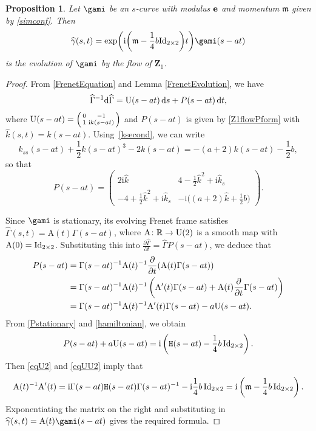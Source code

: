 \documentclass[10pt,a4paper]{amsart}
\newcommand\kk{k} %
\def\ri{\mathrm{i}}
\newcommand\VZ{\mathbf Z}
\newcommand{\ds}{\,{\rm d}s}
\def\gam{\gamma} %
\def\di{\partial}
\def\R{\mathbb R}
\newcommand\be{{\bf e}}
\newcommand\gamf{\widehat{\gam}} %
\newcommand\Gamf{\widehat{\Gamma}} %
\newcommand\kh{\widehat{\kk}} %
\newcommand\rA{\mathrm{A}}
\numberwithin{equation}{section}
\newtheorem{Proposition}[Theorem]{Proposition}
 { \theoremstyle{definition}
\newtheorem{Definition}[Theorem]{Definition}
\newtheorem{Note}[Theorem]{Note}
\newtheorem{Example}[Theorem]{Example}
\newtheorem{Remark}[Theorem]{Remark} }
\begin{document}
\begin{Proposition} \label{timeevolution}Let $\gami$ be an $s$-curve with modulus $\be$ and momentum ${\mathfrak m}$ given by \eqref{simconf}.
Then
\begin{equation*}%
\gamf(s,t)= \exp \biggl(\ri \biggl({\mathfrak m}-\frac14 b{\rm Id}_{2\times 2}\biggr)t\biggr) \gami(s-at)
\end{equation*}
is the evolution of $\gami$ by the flow of $\VZ_1$. \end{Proposition}

\begin{proof} From \eqref{FrenetEquation} and Lemma \ref{FrenetEvolution}, we have
\[\Gamf^{-1}  {\rm d}\Gamf = {\rm U}(s-at)\ds + P(s-at)\, {\rm d}t,\]
where ${\rm U}(s-at) = \left( \begin{smallmatrix} 0 & -1 \\ 1 & \ri k(s-at) \end{smallmatrix} \right)$ and $
P(s-at)$ is given by \eqref{Z1flowPform} with $\kh(s,t) = k(s-at)$.
Using~\eqref{ksecond}, we can write
\[\kk_{ss}(s-at)+\frac12 \kk(s-at)^3-2\kk(s-at)=-(a+2)\kk(s-at)-\frac12 b,\]
so that
\begin{equation}\label{Pstationary}
P(s-a t) =
\begin{pmatrix} 2\ri \kh & 4-\tfrac12 \kh^2 +\ri \kh_s \\
-4+\tfrac12 \kh^2 + \ri \kh_s & -\ri\bigl((a+2)\kh+\tfrac12{b}\bigr) \end{pmatrix}.
\end{equation}

Since $\gami$ is stationary, its evolving Frenet frame satisfies $\Gamf(s,t)=\rA(t) \Gamma(s-at)$, where
${\rA\colon\R\to {\rm U}(2)}$ is a smooth map with $\rA(0)={\rm Id}_{2\times 2}$.
Substituting this into $\frac{\partial \Gamf}{\partial t} = \Gamf P(s-at)$, we deduce that
\begin{align}
P(s-at)={}& \Gamma(s-at)^{-1} \rA(t)^{-1}\frac{\di}{\di t} (\rA(t) \Gamma(s-at))\nonumber\\
={}&\Gamma(s-at)^{-1} \rA(t)^{-1}\left(\rA'(t)  \Gamma(s-at)+\rA(t) \frac{\di}{\di t} \Gamma(s-at)\right)\nonumber\\
={}&\Gamma(s-at)^{-1} \rA(t)^{-1} \rA'(t) \Gamma(s-at) -a {\rm U}(s-at).\label{eqU2}
\end{align}
From \eqref{Pstationary} and \eqref{hamiltonian}, we obtain
\begin{equation}\label{eqUU2} P(s-at)+a {\rm U}(s-at)=\ri \left({\mathtt H}(s-at)-\frac14 b\,{\rm Id}_{2\times 2}\right).\end{equation}
Then \eqref{eqU2} and \eqref{eqUU2} imply that
\[ \rA(t)^{-1} \rA'(t) =\ri \Gamma(s-at) {\mathtt H}(s-at) \Gamma(s-a t)^{-1}
-\ri \frac14 b\,{\rm Id}_{2\times 2}= \ri \left({\mathfrak m}-\frac14{b}\,{\rm Id}_{2\times 2}\right).\]
Exponentiating the matrix on the right and substituting in $\gamf(s,t) = \rA(t) \gami(s-a t)$ gives the required formula.
\end{proof}
\end{document}

